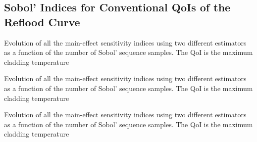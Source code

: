 \subsection{Sobol' Indices for Conventional QoIs of the Reflood Curve}\label{sub:sa_application_conventional_sobol}

{Evolution of all the main-effect sensitivity indices using two different estimators as a function of the number of Sobol' sequence samples.
The QoI is the maximum cladding temperature}

\lipsum[1]

{Evolution of all the main-effect sensitivity indices using two different estimators as a function of the number of Sobol' sequence samples.
The QoI is the maximum cladding temperature}

\lipsum[3]
 
{Evolution of all the main-effect sensitivity indices using two different estimators as a function of the number of Sobol' sequence samples.
The QoI is the maximum cladding temperature}

\lipsum[1]